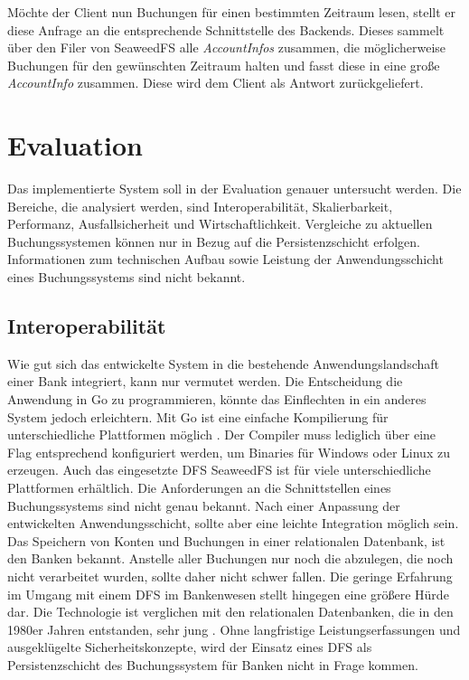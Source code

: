 \documentclass[12pt,oneside,a4paper,parskip]{scrbook}
\begin{document}
Möchte der Client nun Buchungen für einen bestimmten Zeitraum lesen, stellt er diese Anfrage an die entsprechende Schnittstelle des Backends. Dieses sammelt über den Filer von SeaweedFS alle \textit{AccountInfos} zusammen, die möglicherweise Buchungen für den gewünschten Zeitraum halten und fasst diese in eine große \textit{AccountInfo} zusammen. Diese wird dem Client als Antwort zurückgeliefert.

\chapter{Evaluation}
Das implementierte System soll in der Evaluation genauer untersucht werden. Die Bereiche, die analysiert werden, sind Interoperabilität, Skalierbarkeit, Performanz, Ausfallsicherheit und Wirtschaftlichkeit. Vergleiche zu aktuellen Buchungssystemen können nur in Bezug auf die Persistenzschicht erfolgen. Informationen zum technischen Aufbau sowie Leistung der Anwendungsschicht eines Buchungssystems sind nicht bekannt. 

\section{Interoperabilität}
Wie gut sich das entwickelte System in die bestehende Anwendungslandschaft einer Bank integriert, kann nur vermutet werden. Die Entscheidung die Anwendung in Go zu programmieren, könnte das Einflechten in ein anderes System jedoch erleichtern. Mit Go ist eine einfache Kompilierung für unterschiedliche Plattformen möglich \cite{goCompile}. Der Compiler muss lediglich über eine Flag entsprechend konfiguriert werden, um Binaries für Windows oder Linux zu erzeugen. Auch das eingesetzte DFS SeaweedFS ist für viele unterschiedliche Plattformen erhältlich. Die Anforderungen an die Schnittstellen eines Buchungssystems sind nicht genau bekannt. Nach einer Anpassung der entwickelten Anwendungsschicht, sollte aber eine leichte Integration möglich sein. Das Speichern von Konten und Buchungen in einer relationalen Datenbank, ist den Banken bekannt. Anstelle aller Buchungen nur noch die abzulegen, die noch nicht verarbeitet wurden, sollte daher nicht schwer fallen. Die geringe Erfahrung im Umgang mit einem DFS im Bankenwesen stellt hingegen eine größere Hürde dar. Die Technologie ist verglichen mit den relationalen Datenbanken, die in den 1980er Jahren entstanden, sehr jung \cite{wiki:datenbankGeschichte}. Ohne langfristige Leistungserfassungen und ausgeklügelte Sicherheitskonzepte, wird der Einsatz eines DFS als Persistenzschicht des Buchungssystem für Banken nicht in Frage kommen.
\end{document}

